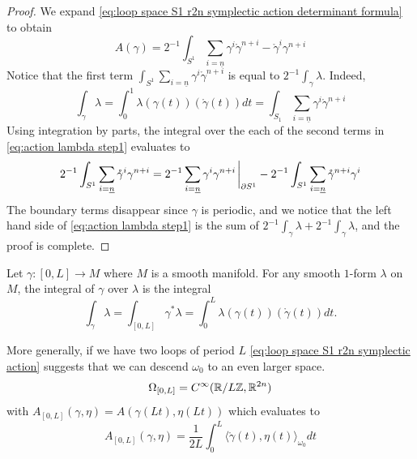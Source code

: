 \documentclass[../main-v2-manifolds.tex]{subfiles}
\begin{document}
\begin{proof}
    We expand \cref{eq:loop space S1 r2n symplectic action determinant formula} to obtain 
    \begin{equation}
        A(\gamma) = 2^{-1}\int_{S^1} \sum_{i =\underline{n}} \gamma^i\mathring{\gamma}^{n+i} - \mathring{\gamma}^{i}\gamma^{n+i} 
        \label{eq:action lambda step1}
    \end{equation}
    Notice that the first term $\int_{S^1} \sum_{i=\underline{n}} \gamma^i\mathring{\gamma}^{n+i}$ is equal to $2^{-1}\int_\gamma \lambda$. Indeed,
    \[
        \int_{\gamma}\lambda = \int_{0}^1 \lambda(\gamma(t))(\mathring{\gamma}(t)) dt = \int_{S_1} \sum_{i=\underline{n}}\gamma^i\mathring{\gamma}^{n+i}
    \]
    Using integration by parts, the integral over the each of the second terms in \cref{eq:action lambda step1} evaluates to
    \[
        2^{-1}\int_{S^1} \sum_{i=\underline{n}} \mathring{\gamma}^{i}\gamma^{n+i}=2^{-1}\sum_{i=\underline{n}}\gamma^{i}\gamma^{n+i}\eval_{\partial S^1} - 2^{-1}\int_{S^1}\sum_{i=\underline{n}}\mathring{\gamma}^{n+i}\gamma^{i}
    \]
    The boundary terms disappear since $\gamma$ is periodic, and we notice that the left hand side of \cref{eq:action lambda step1} is the sum of $2^{-1}\int_\gamma\lambda + 2^{-1}\int_{\gamma}\lambda$, and the proof is complete.
\end{proof}

\begin{remark}
    Let $\gamma: [0,L]\to M$ where $M$ is a smooth manifold. For any smooth $1$-form $\lambda$ on $M$, the integral of $\gamma$ over $\lambda$ is the integral
    \[
        \int_\gamma \lambda =  \int_{[0,L]} \gamma^*\lambda = \int_{0}^{L}\lambda(\gamma(t))(\mathring{\gamma}(t))dt.
    \]
\end{remark}
%
%
%
\begin{remark}
    More generally, if we have two loops of period $L$ \cref{eq:loop space S1 r2n symplectic action} suggests that we can descend $\omega_0$ to an even larger space.
    \begin{equation}
        \Omega_{[0,L]} = C^\infty(\mathbb{R}/L\mathbb{Z}, {\mathbb{R}^{2n}})
        \label{eq:[0,L] r2n space}
    \end{equation}
    with $A_{[0,L]}(\gamma,\eta) = A(\gamma(Lt),\eta(Lt))$ which evaluates to
    \begin{equation}
     A_{[0,L]}(\gamma,\eta) = \frac{1}{2L}\int_{0}^{L}\langle \mathring{\gamma}(t),\eta(t)\rangle_{\omega_0}dt
     \label{eq:[0,L] r2n symplectic action}
    \end{equation}
\end{remark}
\end{document}
